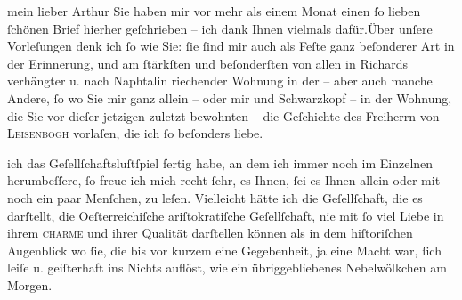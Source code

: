 \pstart{}mein lieber Arthur\pend\vspace{0.5em}
\pstart
           Sie haben mir vor mehr als einem Monat einen ſo lieben ſchönen Brief hierher
               geſchrieben – ich dank Ihnen vielmals dafür.\hspace*{1.5em}Über
               unſere Vorleſungen denk ich ſo wie Sie: ſie ſind mir auch als Feſte ganz beſonderer
               Art in der Erinnerung, und am ſtärkſten und beſonderſten von allen \label{K_L02331-1v}\label{K_L02331-1} in Richards verhängter u. nach
               Naphtalin riechender Wohnung in der \label{K_L02331-2v}\label{K_L02331-2} – aber auch manche Andere, ſo \label{K_L02331-3v}\label{K_L02331-3} wo Sie mir ganz allein – oder mir und Schwarzkopf – in der Wohnung, die Sie vor dieſer jetzigen zuletzt bewohnten
               – die Geſchichte des Freiherrn von \textsc{Leisenbogh} vorlaſen, die ich ſo beſonders liebe.\pend
           
\pstart
           \label{T_L02331-1v}\label{T_L02331-1}{ }{\pb}ich das Geſellſchaftsluſtſpiel fertig habe, an dem
               ich immer noch im Einzelnen herumbeſſere, ſo freue ich mich recht ſehr, es Ihnen, ſei
               es Ihnen allein oder mit noch ein paar Menſchen, zu leſen. Vielleicht hätte ich die
               Geſellſchaft, die es darſtellt, die Oeſterreichiſche  ariſtokratiſche Geſellſchaft, nie mit ſo viel Liebe in ihrem \textsc{charme} und ihrer Qualität darſtellen können als in dem
               hiſtoriſchen Augenblick wo ſie, die bis vor kurzem eine Gegebenheit, ja eine Macht
               war, ſich leiſe u. geiſterhaft ins Nichts auflöst, wie {\pb}ein übriggebliebenes Nebelwölkchen
               am Morgen.\pend
           
